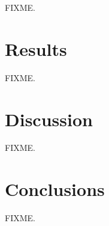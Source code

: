 \begin{doublespace}
FIXME.
\end{doublespace}

\section{Results}

\begin{doublespace}
FIXME.
\end{doublespace}

\section{Discussion}

\begin{doublespace}
FIXME.
\end{doublespace}

\section{Conclusions}

\begin{doublespace}
FIXME.
\end{doublespace}




